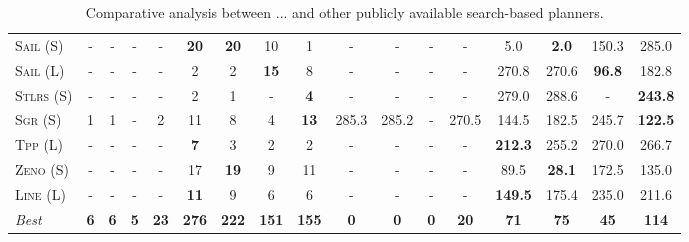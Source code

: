 \begin{table}[tb]
{\begin{tabular}{|l||cccccccc||cccccccc||}
\textsc{Sail} (S)&-&-&-&-&\textbf{20}&\textbf{20}&10&1&-&-&-&-&5.0&\textbf{2.0}&150.3&285.0\\
\textsc{Sail} (L)&-&-&-&-&2&2&\textbf{15}&8&-&-&-&-&270.8&270.6&\textbf{96.8}&182.8\\
\textsc{Stlrs} (S)&-&-&-&-&2&1&-&\textbf{4}&-&-&-&-&279.0&288.6&-&\textbf{243.8}\\
\textsc{Sgr} (S)&1&1&-&2&11&8&4&\textbf{13}&285.3&285.2&-&270.5&144.5&182.5&245.7&\textbf{122.5}\\
\textsc{Tpp} (L)&-&-&-&-&\textbf{7}&3&2&2&-&-&-&-&\textbf{212.3}&255.2&270.0&266.7\\
\textsc{Zeno} (S)&-&-&-&-&17&\textbf{19}&9&11&-&-&-&-&89.5&\textbf{28.1}&172.5&135.0\\
\textsc{Line} (L)&-&-&-&-&\textbf{11}&9&6&6&-&-&-&-&\textbf{149.5}&175.4&235.0&211.6
\\\hline
\textit{Best}&\textbf{6}&\textbf{6}&\textbf{5}&\textbf{23}&\textbf{276}&\textbf{222}&\textbf{151}&\textbf{155}&\textbf{0}&\textbf{0}&\textbf{0}&\textbf{20}&\textbf{71}&\textbf{75}&\textbf{45}&\textbf{114}\\\hline

        \end{tabular}}
        \caption{Comparative analysis between ... and other publicly available search-based planners.}
        \label{tab:search}
        \end{table}
        